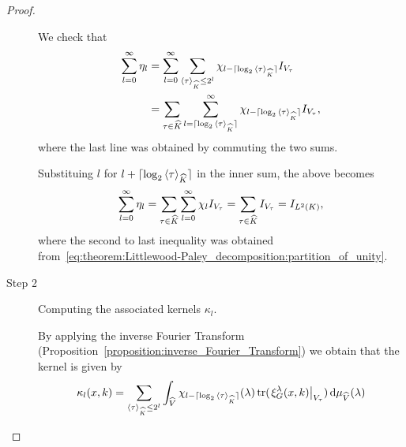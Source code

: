 \begin{proof}
\begin{description}
            We check that
            \begin{align*}
                \sum_{l = 0}^\infty \eta_l
                &= \sum_{l = 0}^\infty
                    \sum_{{\langle \tau \rangle}_{{\widehat{K}}} \leq 2^l}
                        \chi_{l - \lceil\log_2 {\langle \tau \rangle}_{{\widehat{K}}}\rceil} {I_{V_\tau}}\\
                &= \sum_{\tau \in {\widehat{K}}}
                    \sum_{l = \lceil\log_2 {\langle \tau \rangle}_{{\widehat{K}}}\rceil}^\infty
                        \chi_{l - \lceil\log_2 {\langle \tau \rangle}_{{\widehat{K}}}\rceil} {I_{V_\tau}},
            \end{align*}
            where the last line was obtained by commuting the two sums.

            Substituing $l$ for $l + \lceil\log_2 {\langle \tau \rangle}_{{\widehat{K}}}\rceil$ in the inner sum,
            the above becomes
            \begin{align*}
                \sum_{l = 0}^\infty \eta_l
                = \sum_{\tau \in {\widehat{K}}}
                    \sum_{l = 0}^\infty
                        \chi_l {I_{V_\tau}}
                = \sum_{\tau \in {\widehat{K}}}
                    {I_{V_\tau}}
                = {I_{{L^{2} (K)}}},
            \end{align*}
            where the second to last inequality was obtained from~\eqref{eq:theorem:Littlewood-Paley_decomposition:partition_of_unity}.

        \item[Step 2] Computing the associated kernels $\kappa_l$.

            By applying the inverse Fourier Transform (Proposition~\ref{proposition:inverse_Fourier_Transform})
            we obtain that the kernel is given by
            \begin{align}
                \kappa_l(x, k)
                = \sum_{{\langle \tau \rangle}_{{\widehat{K}}} \leq 2^l}
                    \int_{\widehat{V}}
                        \chi_{l - \lceil\log_2 {\langle \tau \rangle}_{{\widehat{K}}}\rceil}(\lambda) \operatorname{tr}( \left. \xi^{\lambda}_{G}(x, k) \right|_{V_\tau} )
                    \,\mathrm{d} \mu_{{\widehat{V}}}(\lambda)
                \label{eq:theorem:Littlewood-Paley_decomposition:computing_kernel}
            \end{align}


\end{description}
\end{proof}
